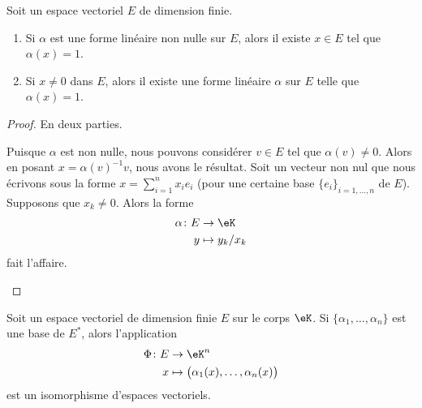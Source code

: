 \begin{lemma}           \label{LEMooQLWNooYUpGdo}
	Soit un espace vectoriel \( E\) de dimension finie.
	\begin{enumerate}
		\item       \label{ITEMooHHTLooNCjgfn}
		      Si \( \alpha\) est une forme linéaire non nulle sur \( E\), alors il existe \( x\in E\) tel que \( \alpha(x)=1\).
		\item       \label{ITEMooBYAAooUWBKDk}
		      Si \( x\neq 0\) dans \( E\), alors il existe une forme linéaire \( \alpha\) sur \( E\) telle que \( \alpha(x)=1\).
	\end{enumerate}
\end{lemma}

\begin{proof}
	En deux parties.
	\begin{subproof}
		Puisque \( \alpha\) est non nulle, nous pouvons considérer \( v\in E\) tel que \( \alpha(v)\neq 0\). Alors en posant \( x=\alpha(v)^{-1}  v\), nous avons le résultat.
		Soit un vecteur non nul que nous écrivons sous la forme \( x=\sum_{i=1}^nx_ie_i\) (pour une certaine base \( \{ e_i \}_{i=1,\ldots, n}\) de \( E\)). Supposons que \( x_k\neq 0\). Alors la forme
		\begin{equation}
			\begin{aligned}
				\alpha\colon  E & \to \eK         \\
				y               & \mapsto y_k/x_k
			\end{aligned}
		\end{equation}
		fait l'affaire.
	\end{subproof}
\end{proof}

\begin{lemma}       \label{LEMooKTREooBrnWVz}
	Soit un espace vectoriel de dimension finie \( E\) sur le corps \( \eK\). Si \( \{ \alpha_1,\ldots,\alpha_n \}\) est une base de \( E^*\), alors l'application
	\begin{equation}
		\begin{aligned}
			\Phi\colon E & \to \eK^n                                           \\
			x            & \mapsto \big( \alpha_1(x),\ldots, \alpha_n(x) \big)
		\end{aligned}
	\end{equation}
	est un isomorphisme d'espaces vectoriels.
\end{lemma}

